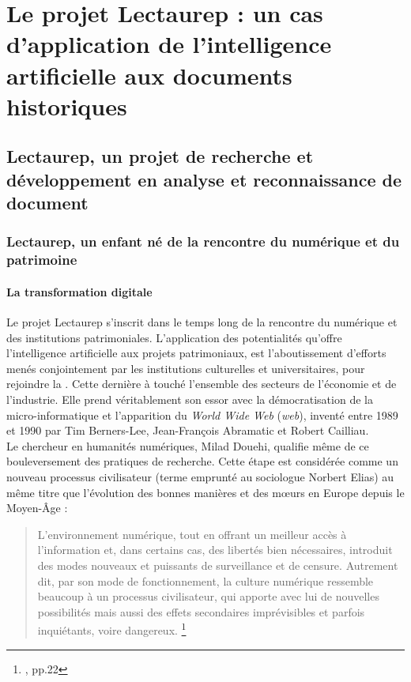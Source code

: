 \part{Le projet Lectaurep : un cas d'application de l'\og intelligence artificielle\fg{} aux documents historiques}\label{partie_1}

\chapter{Lectaurep, un projet de recherche et développement en analyse et reconnaissance de document}

\section{Lectaurep, un enfant né de la rencontre du numérique et du patrimoine}

\subsection{La transformation digitale}

Le projet Lectaurep s'inscrit dans le temps long de la rencontre du numérique et des institutions patrimoniales. L'application des potentialités qu'offre l'intelligence artificielle aux projets patrimoniaux, est l'aboutissement d'efforts menés conjointement par les institutions culturelles et universitaires, pour rejoindre la . Cette dernière à touché l'ensemble des secteurs de l'économie et de l'industrie. 
Elle prend véritablement son essor avec la démocratisation de la micro-informatique et l'apparition du \textit{World Wide Web} (\textit{web}), inventé entre 1989 et 1990 par Tim Berners-Lee, Jean-François Abramatic et Robert Cailliau.\\

Le chercheur en humanités numériques, Milad Douehi, qualifie même de  ce bouleversement des pratiques de recherche. Cette étape est considérée comme un nouveau processus civilisateur (terme emprunté au sociologue Norbert Elias) au même titre que l'évolution des bonnes manières et des m\oe{}urs en Europe depuis le Moyen-Âge : 

\begin{quote}
    L'environnement numérique, tout en offrant un meilleur accès à l'information et, dans certains cas, des libertés bien nécessaires, introduit des modes nouveaux et puissants de surveillance et de censure. Autrement dit, par son mode de fonctionnement, la culture numérique ressemble beaucoup à un processus civilisateur, qui apporte avec lui de nouvelles possibilités mais aussi des effets secondaires imprévisibles et parfois inquiétants, voire dangereux. \footnote{\cite{doueihi_grande_2011}, pp.22}
\end{quote}


